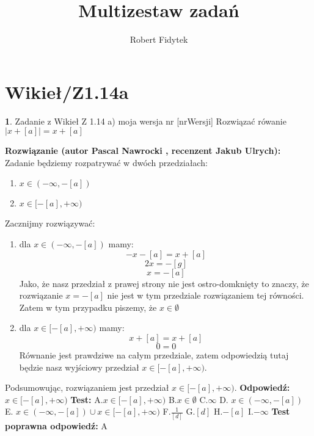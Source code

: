 \documentclass[12pt, a4paper]{article}
\title{Multizestaw zadań}
\author{Robert Fidytek}
\date{}
\theoremstyle{definition} %
\newtheorem{zad}{}
\newcommand{\kategoria}[1]{\section{#1}} %
\newcommand{\zadStart}[1]{\begin{zad}#1\newline} %
\newcommand{\zadStop}{\end{zad}}   %
\newcommand{\rozwStart}[2]{\noindent \textbf{Rozwiązanie (autor #1 , recenzent #2): }\newline} %
\newcommand{\rozwStop}{\newline}                                            %
\newcommand{\odpStart}{\noindent \textbf{Odpowiedź:}\newline}    %
\newcommand{\odpStop}{\newline}                                             %
\newcommand{\testStart}{\noindent \textbf{Test:}\newline} %
\newcommand{\testStop}{\newline} %
\newcommand{\kluczStart}{\noindent \textbf{Test poprawna odpowiedź:}\newline} %
\newcommand{\kluczStop}{\newline} %
\begin{document}
\maketitle



\kategoria{Wikieł/Z1.14a}
\zadStart{Zadanie z Wikieł Z 1.14 a) moja wersja nr [nrWersji]}
Rozwiązać rówanie $|x+[a]|=x+[a]$
\zadStop
\rozwStart{Pascal Nawrocki}{Jakub Ulrych}
Zadanie będziemy rozpatrywać w dwóch przedziałach:
\begin{enumerate}
\item $x\in (-\infty,-[a])$
\item $x\in[-[a],+\infty)$
\end{enumerate}
Zacznijmy rozwiązywać:
\begin{enumerate}
\item dla $x\in (-\infty,-[a])$ mamy:
$$-x-[a]=x+[a]$$
$$2x=-[g]$$
$$x=-[a]$$
Jako, że nasz przedział z prawej strony nie jest ostro-domknięty to znaczy, że rozwiązanie $x=-[a]$ nie jest w tym przedziale rozwiązaniem tej równości. Zatem w tym przypadku piszemy, że $x\in \emptyset$
\item dla $x\in[-[a],+\infty)$ mamy:
$$x+[a]=x+[a]$$
$$0=0$$
Równanie jest prawdziwe na całym przedziale, zatem odpowiedzią tutaj będzie nasz wyjściowy przedział $x\in[-[a],+\infty)$.
\end{enumerate}
Podsumowując, rozwiązaniem jest przedział $x\in[-[a],+\infty)$.
\rozwStop
\odpStart
$x\in[-[a],+\infty)$
\odpStop
\testStart
A.$x\in[-[a],+\infty)$
B.$x\in \emptyset$
C.$\infty$
D. $x\in (-\infty,-[a])$
E. $x\in (-\infty,-[a])\cup x\in[-[a],+\infty)$
F.$\frac{1}{[d]}$
G.$[d]$
H.$-[a]$
I.$-\infty$
\testStop
\kluczStart
A
\kluczStop
\end{document}
